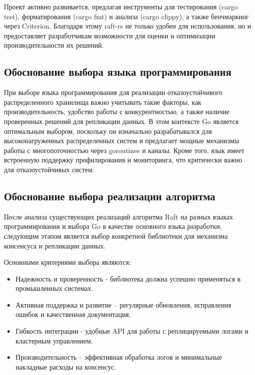 Проект активно развивается, предлагая инструменты для тестирования (cargo test),
форматирования (cargo fmt) и анализа (cargo clippy), а также бенчмаркинг через
Criterion. Благодаря этому raft-rs не только удобен для использования, но и
предоставляет разработчикам возможности для оценки и оптимизации производительности их
решений.

\subsection{Обоснование выбора языка программирования}

При выборе языка программирования для реализации отказоустойчивого распределенного
хранилища важно учитывать такие факторы, как производительность, удобство работы с
конкурентностью, а также наличие проверенных решений для репликации данных. В этом
контексте Go является оптимальным выбором, поскольку он изначально разрабатывался для
высоконагруженных распределенных систем и предлагает мощные механизмы работы с
многопоточностью через goroutines и каналы. Кроме того, язык имеет встроенную поддержку
профилирования и мониторинга, что критически важно для отказоустойчивых систем.

\subsection{Обоснование выбора реализации алгоритма}

После анализа существующих реализаций алгоритма Raft на разных языках программирования и
выбора Go в качестве основного языка разработки, следующим этапом является выбор
конкретной библиотеки для механизма консенсуса и репликации данных.

Основными критериями выбора являются:

\begin{itemize}
    \item Надежность и проверенность - библиотека должна успешно применяться в
    промышленных системах.
    \item Активная поддержка и развитие – регулярные обновления, исправления ошибок и
    качественная документация.
    \item Гибкость интеграции - удобные API для работы с реплицируемыми логами и
    кластерным управлением.
    \item Производительность – эффективная обработка логов и минимальные накладные
    расходы на консенсус.
\end{itemize}

